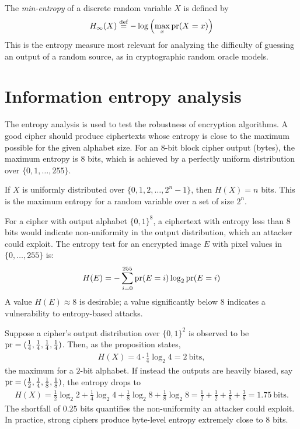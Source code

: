 \documentclass[a4paper, 12pt]{book} %
\begin{document}
\begin{definition}
    The \emph{min-entropy} of a discrete random variable $X$ is defined by
    \begin{align}
        H_\infty(X) \overset{\text{def}}{=} -\log\left( \max_x \operatorname{pr}(X = x) \right)
    \end{align}
    This is the entropy measure most relevant for analyzing the difficulty of guessing an output of a random source, as in cryptographic random oracle models.
\end{definition}

\section{Information entropy analysis}

The entropy analysis is used to test the robustness of encryption algorithms. A
good cipher should produce ciphertexts whose entropy is close to the maximum
possible for the given alphabet size. For an 8-bit block cipher output (bytes),
the maximum entropy is 8 bits, which is achieved by a perfectly uniform
distribution over $\{0, 1, \ldots, 255\}$.

\begin{proposition}
    If $X$ is uniformly distributed over $\{0, 1, 2, \ldots, 2^n - 1\}$, then $H(X) = n$ bits. This is the maximum entropy for a random variable over a set of size $2^n$.
\end{proposition}

\begin{remark}
    For a cipher with output alphabet $\{0, 1\}^8$, a ciphertext with entropy less than $8$ bits would indicate non-uniformity in the output distribution, which an attacker could exploit. The entropy test for an encrypted image $E$ with pixel values in $\{0, \ldots, 255\}$ is:
    \begin{align}
        H(E) = -\sum_{i=0}^{255} \operatorname{pr}(E = i) \log_2 \operatorname{pr}(E = i)
    \end{align}
    A value $H(E) \approx 8$ is desirable; a value significantly below 8 indicates a vulnerability to entropy-based attacks.
\end{remark}

\begin{example}
    Suppose a cipher's output distribution over $\{0,1\}^2$ is observed to be $\operatorname{pr} = (\tfrac14, \tfrac14, \tfrac14, \tfrac14)$. Then, as the proposition states,
    \begin{align}
        H(X) = 4 \cdot \frac14 \log_2 4 = 2 \ \text{bits},
    \end{align}
    the maximum for a $2$-bit alphabet. If instead the outputs are heavily biased, say $\operatorname{pr} = (\tfrac12, \tfrac14, \tfrac18, \tfrac18)$, the entropy drops to
    \begin{align}
        H(X) = \tfrac12\log_2 2 + \tfrac14\log_2 4 + \tfrac18\log_2 8 + \tfrac18\log_2 8 = \tfrac12 + \tfrac12 + \tfrac38 + \tfrac38 = 1.75 \ \text{bits}.
    \end{align}
    The shortfall of $0.25$ bits quantifies the non-uniformity an attacker could exploit. In practice, strong ciphers produce byte-level entropy extremely close to $8$ bits.
\end{example}
\end{document}
